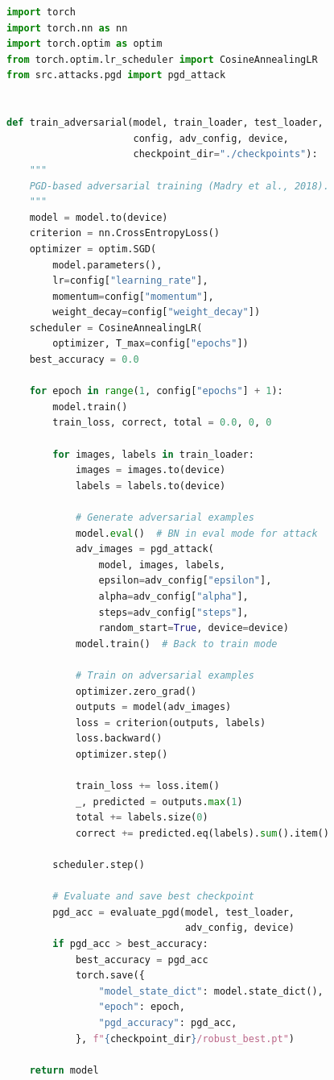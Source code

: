 \begin{lstlisting}[language=Python, caption={PGD Adversarial Training Loop}, label={lst:adv_training}]
import torch
import torch.nn as nn
import torch.optim as optim
from torch.optim.lr_scheduler import CosineAnnealingLR
from src.attacks.pgd import pgd_attack


def train_adversarial(model, train_loader, test_loader,
                      config, adv_config, device,
                      checkpoint_dir="./checkpoints"):
    """
    PGD-based adversarial training (Madry et al., 2018).
    """
    model = model.to(device)
    criterion = nn.CrossEntropyLoss()
    optimizer = optim.SGD(
        model.parameters(),
        lr=config["learning_rate"],
        momentum=config["momentum"],
        weight_decay=config["weight_decay"])
    scheduler = CosineAnnealingLR(
        optimizer, T_max=config["epochs"])
    best_accuracy = 0.0

    for epoch in range(1, config["epochs"] + 1):
        model.train()
        train_loss, correct, total = 0.0, 0, 0

        for images, labels in train_loader:
            images = images.to(device)
            labels = labels.to(device)

            # Generate adversarial examples
            model.eval()  # BN in eval mode for attack
            adv_images = pgd_attack(
                model, images, labels,
                epsilon=adv_config["epsilon"],
                alpha=adv_config["alpha"],
                steps=adv_config["steps"],
                random_start=True, device=device)
            model.train()  # Back to train mode

            # Train on adversarial examples
            optimizer.zero_grad()
            outputs = model(adv_images)
            loss = criterion(outputs, labels)
            loss.backward()
            optimizer.step()

            train_loss += loss.item()
            _, predicted = outputs.max(1)
            total += labels.size(0)
            correct += predicted.eq(labels).sum().item()

        scheduler.step()

        # Evaluate and save best checkpoint
        pgd_acc = evaluate_pgd(model, test_loader,
                               adv_config, device)
        if pgd_acc > best_accuracy:
            best_accuracy = pgd_acc
            torch.save({
                "model_state_dict": model.state_dict(),
                "epoch": epoch,
                "pgd_accuracy": pgd_acc,
            }, f"{checkpoint_dir}/robust_best.pt")

    return model
\end{lstlisting}

